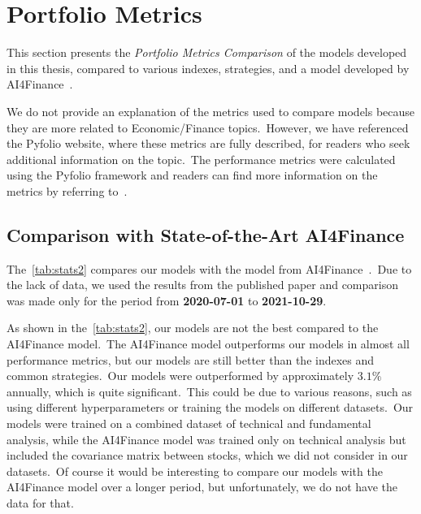 \documentclass[../xlapes02]{subfiles}
\begin{document}
    \section{Portfolio Metrics}\label{sec:portfolio-metrics}
    This section presents the \emph{Portfolio Metrics Comparison} of the models developed in this thesis, compared to various indexes, strategies, and a model developed by AI4Finance~\cite{finrl-portfolio-allocation-2020}.

    We do not provide an explanation of the metrics used to compare models because they are more related to Economic/Finance topics.\ However, we have referenced the Pyfolio website, where these metrics are fully described, for readers who seek additional information on the topic.\ The performance metrics were calculated using the Pyfolio framework and readers can find more information on the metrics by referring to~\cite{Pyfolio, Pyfolio-return-analysis}.

    \subsection{Comparison with State-of-the-Art AI4Finance}\label{subsec:ai4finance-model}
    The~\cref{tab:stats2} compares our models with the model from AI4Finance~\cite{finrl-portfolio-allocation-2020}.\ Due to the lack of data, we used the results from the published paper and comparison was made only for the period from \textbf{2020-07-01} to \textbf{2021-10-29}.

    As shown in the~\cref{tab:stats2}, our models are not the best compared to the AI4Finance model.\ The AI4Finance model outperforms our models in almost all performance metrics, but our models are still better than the indexes and common strategies.\ Our models were outperformed by approximately $3.1\%$ annually, which is quite significant.\ This could be due to various reasons, such as using different hyperparameters or training the models on different datasets.\ Our models were trained on a combined dataset of technical and fundamental analysis, while the AI4Finance model was trained only on technical analysis but included the covariance matrix between stocks, which we did not consider in our datasets.\ Of course it would be interesting to compare our models with the AI4Finance model over a longer period, but unfortunately, we do not have the data for that.
\end{document}
